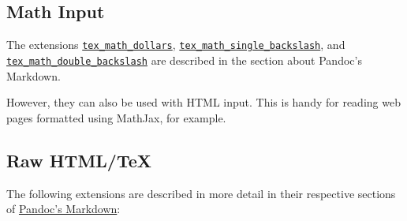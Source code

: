 \documentclass[]{article}
\begin{document}
\hypertarget{math-input}{%
\subsection{Math Input}\label{math-input}}

The extensions
\protect\hyperlink{extension-tex_math_dollars}{\texttt{tex\_math\_dollars}},
\protect\hyperlink{extension-tex_math_single_backslash}{\texttt{tex\_math\_single\_backslash}},
and
\protect\hyperlink{extension-tex_math_double_backslash}{\texttt{tex\_math\_double\_backslash}}
are described in the section about Pandoc's Markdown.

However, they can also be used with HTML input. This is handy for
reading web pages formatted using MathJax, for example.

\hypertarget{raw-htmltex}{%
\subsection{Raw HTML/TeX}\label{raw-htmltex}}

The following extensions are described in more detail in their
respective sections of \protect\hyperlink{pandocs-markdown}{Pandoc's
Markdown}:
\end{document}
